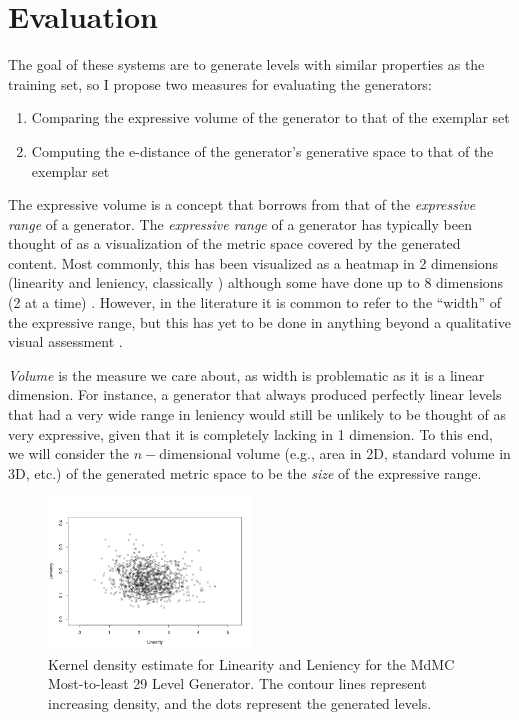 \documentclass[12pt]{report}
\begin{document}
\section*{Evaluation}

The goal of these systems are to generate levels with similar properties as the training set, so I propose two measures for evaluating the generators:

\begin{enumerate}
\item Comparing the expressive volume of the generator to that of the exemplar set
\item Computing the e-distance of the generator's generative space to that of the exemplar set
\end{enumerate}

The expressive volume is a concept that borrows from that of the \textit{expressive range} of a generator. The \textit{expressive range} \cite{smith2010analyzing} of a generator has typically been thought of as a visualization of the metric space covered by the generated content.  Most commonly, this has been visualized as a heatmap in 2 dimensions (linearity and leniency, classically \cite{van2013designing,snodgrass2015hierarchical}) although some have done up to 8 dimensions (2 at a time) \cite{summerville2016mariostring}.  However, in the literature it is common to refer to the ``width'' of the expressive range, but this has yet to be done in anything beyond a qualitative visual assessment \cite{smith2011launchpad}.  


\textit{Volume} is the measure we care about, as width is problematic as it is a linear dimension.  For instance, a generator that always produced perfectly linear levels that had a very wide range in leniency would still be unlikely to be thought of as very expressive, given that it is completely lacking in 1 dimension.  To this end, we will consider the $n-$dimensional volume (e.g., area in 2D, standard volume in 3D, etc.) of the generated metric space to be the \textit{size} of the expressive range.

\begin{figure}[tb]
\centering
  
  \includegraphics[width=0.48\textwidth]{Figures/kde.png}
    \caption{Kernel density estimate for Linearity and Leniency for the MdMC Most-to-least 29 Level Generator. The contour lines represent increasing density, and the dots represent the generated levels. } 
    \label{fig:KDE}
\end{figure}
\end{document}
